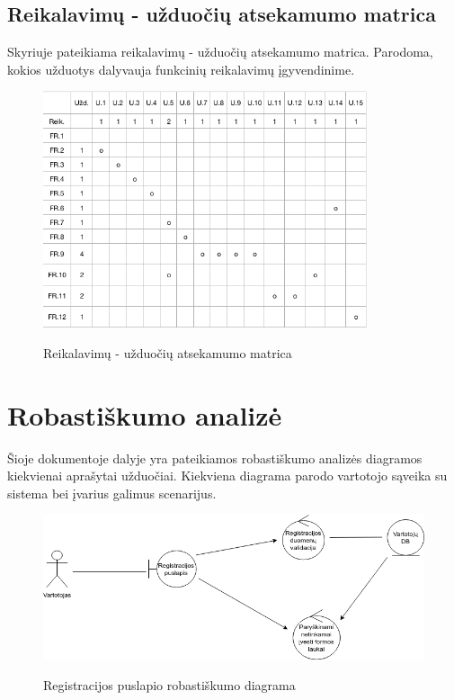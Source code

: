 \documentclass{VUMIFPSkursinis}
\begin{document}
	\subsection{Reikalavimų - užduočių atsekamumo matrica}
	Skyriuje pateikiama reikalavimų - užduočių atsekamumo matrica. Parodoma, kokios užduotys dalyvauja funkcinių reikalavimų įgyvendinime.\\
	\begin{figure}[H]
		\centering
		\includegraphics[width=0.85\textwidth]{img/matrix.png}
		\label{fig:matrix}
		\caption{Reikalavimų - užduočių atsekamumo matrica}
	\end{figure}
	
	\newpage
	
	\section{Robastiškumo analizė}
	Šioje dokumentoje dalyje yra pateikiamos robastiškumo analizės diagramos kiekvienai aprašytai užduočiai. Kiekviena diagrama parodo vartotojo sąveika su sistema  bei įvarius galimus scenarijus.

		\begin{figure}[H]
		\centering
		\includegraphics[width=\linewidth]{img/registracija.png}
		\label{fig:registracija}
		\caption{Registracijos puslapio robastiškumo diagrama}
	\end{figure}
\end{document}
